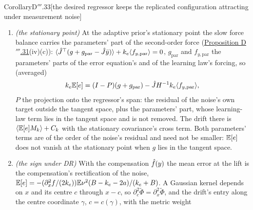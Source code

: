 \begin{thm}{Corollary}{D$'''$.33}[the desired regressor keeps the replicated configuration attracting under
measurement noise]
\begin{enumerate}[label=\textup{(\roman*)}]
    $\abs{g}\le\frac12\abs{\partial^2_xf}\E\nu^2(1 + O(\abs{a}/k_e))$
    (\hyperref[res:thmDppp:31]{Proposition D$'''$.31}(iv)(c)), so
    $\norm{S_k}\le(\E\nu^2/(2k_e))\norm{\partial^2_xf}_\infty\langle\norm{M_k}\rangle(1 + O(1/k_e))$: the drift and the
    stiffness are both $O(1/k_e)$, and the noise level up to which the replicated configuration attracts at the lift
    is bounded below uniformly in $k_e$ ---
    $\E\nu^2\ge2\sigma_0/(\norm{\partial^2_xf}_\infty\max_k\langle\norm{M_k}\rangle)$ up to $(1 + O(1/k_e))$ ---, and
    constant when the noise's bandwidth is scaled with the gain ($B/k_e$ fixed, where $k_eS_k$ depends on $k_e$ only
    through $a/k_e$). For a sensor of fixed bandwidth the factor $(B - k_e - 2a)/(k_e + B)$ of (iv) changes sign at
    $k_e\approx B$, and DR's drift with it; the thresholds then fall toward the bound's level. Under the measured
    regressor the threshold falls like $1/k_e$ in the variance while $k_e\ll B$, and levels off for $k_e\gg B$, where
    $\E[\varepsilon_m^2]\to\E\nu^2B/k_e$.
  \item \emph{(the stationary point)} At the adaptive prior's stationary point the slow force balance carries the
    parameters' part of the second-order force (\hyperref[res:thmDppp:31]{Proposition D$'''$.31}(iv)(c)):
    $\langle\hat J^\top(g + g_{\mathrm{par}} - \hat J\bar y)\rangle + k_e\langle f_{y,\mathrm{par}}\rangle = 0$,
    $g_{\mathrm{par}}$ and $f_{y,\mathrm{par}}$ the parameters' parts of the error equation's and of the learning
    law's forcing, so (averaged)
    \[
      k_e\mathbb{E}[e] = (I - P)(g + g_{\mathrm{par}}) - \hat JH^{-1}k_e\langle f_{y,\mathrm{par}}\rangle,
    \]
    $P$ the projection onto the regressor's span: the residual of the noise's own target outside the tangent space,
    plus the parameters' part, whose learning-law term lies in the tangent space and is not removed. The drift there
    is $\langle\mathbb{E}[e]M_k\rangle + C_k$ with the stationary covariance's cross term. Both parameters' terms are of the
    order of the noise's residual and need not be smaller: $\mathbb{E}[e]$ does not vanish at the stationary point when $g$
    lies in the tangent space.
  \item \emph{(the sign under DR)} With the compensation $\hat f(y)$ the mean error at the lift is the compensation's
    rectification of the noise, $\mathbb{E}[e] = -(\partial^2_xf/(2k_e))\mathbb{E}\nu^2(B - k_e - 2a)/(k_e + B)$. A Gaussian kernel
    depends on $x$ and its centre $c$ through $x - c$, so $\partial^2_c\tilde\Phi = \partial^2_x\tilde\Phi$, and the
    drift's entry along the centre coordinate $\gamma$, $c = c(\gamma)$, with the metric weight

\end{enumerate}
\end{thm}
